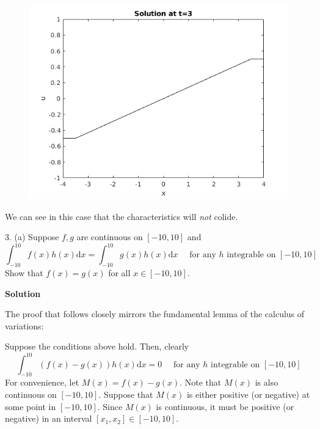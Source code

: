 \documentclass{article}
\begin{document}
%
\begin{figure}[H]
    \centering
    \includegraphics[width=12cm]{q2pb-3}
\end{figure}
%
We can see in this case that the characteristics will \textit{not}
colide.

\newpage

3. (a) Suppose $f, g$ are continuous on $[-10, 10]$ and
%
\begin{equation*}
    \int_{-10}^{10} f(x) h(x) \mathrm{d} x = \int_{-10}^{10} g(x) h(x)\mathrm{d} x
    \quad \text { for any } h \text { integrable on } [-10, 10]
\end{equation*}
%
Show that $f(x) = g(x)$ for all $x \in [-10, 10]$.

\textbf{Solution}

The proof that follows closely mirrors the fundamental lemma of the
calculus of variations:

Suppose the conditions above hold. Then, clearly
%
\begin{equation}
    \int_{-10}^{10} \left(f(x) - g(x)\right) h(x) \mathrm{d} x = 0
    \quad \text { for any } h \text { integrable on } [-10, 10]
    \label{eq:q3pa}
\end{equation}
%
For convenience, let $M(x) = f(x) - g(x)$. Note that $M(x)$ is also
continuous on $[-10, 10]$. Suppose that $M(x)$ is either positive (or
negative) at some point in $[-10, 10]$. Since $M(x)$ is continuous, it
must be positive (or negative) in an interval $[x_1, x_2] \in [-10, 10]$.
\end{document}
